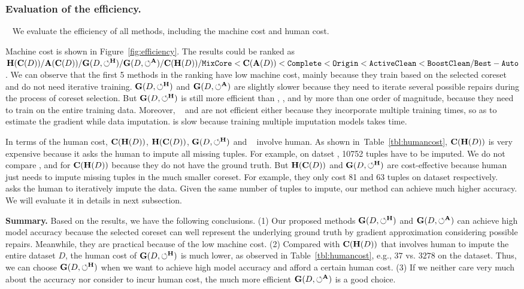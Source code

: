  



\subsubsection{Evaluation of the efficiency.}~\label{sec:exp:efficiency} We  evaluate the efficiency of all methods, including the machine cost and human cost.

 Machine cost is shown  in Figure~\ref{fig:efficiency}.  The results could be ranked as $\mathbf{H}(\mathbf{C}(D))/\mathbf{A}(\mathbf{C}(D))/\mathbf{G}(D,\circlearrowleft^\mathbf{H})/\mathbf{G}(D,\circlearrowleft^\mathbf{A})/\mathbf{C}(\mathbf{H}(D))/{\tt MixCore} < \mathbf{C}(\mathbf{A}(D)) < {\tt Complete} < {\tt Origin} < {\tt ActiveClean} < {\tt BoostClean} /{\tt Best-Auto} $. We can observe that the first 5 methods in the ranking have low machine cost, mainly because they train based on the selected coreset and do not need iterative training. $\mathbf{G}(D,\circlearrowleft^\mathbf{H})$ and  $\mathbf{G}(D,\circlearrowleft^\mathbf{A})$ are slightly slower  because they need to iterate several possible repairs during the process of coreset selection.  But $\mathbf{G}(D,\circlearrowleft^\mathbf{H})$ is still more efficient than \noclean, \truth, \boostclean and \gain by more than one order of magnitude,  because they need to train on the entire training data. 
 Moreover, \actclean~  and \boostclean are  not efficient either because they incorporate multiple training times, so as to estimate the gradient while data imputation. \gain is slow because training multiple imputation models takes time.


 In terms of the human cost, $\mathbf{C}(\mathbf{H}(D))$, $\mathbf{H}(\mathbf{C}(D))$, $\mathbf{G}(D,\circlearrowleft^\mathbf{H})$ and  \actclean~ involve human. As shown in~Table~\ref{tbl:humancost}, $\mathbf{C}(\mathbf{H}(D))$ is very expensive because it asks the human to impute all missing tuples. For example, on datset \adult, 10752 tuples have to be imputed. We do not compare \credit, \bike and \air for $\mathbf{C}(\mathbf{H}(D))$ because they do not have the ground truth.
 But $\mathbf{H}(\mathbf{C}(D))$ and $\mathbf{G}(D,\circlearrowleft^\mathbf{H})$ are cost-effective because human just needs to impute missing tuples in the much smaller coreset. For example, they only cost 81 and 63 tuples on dataset \adult respectively. 
\actclean~ asks the human to iteratively impute the data. Given the same number of tuples to impute, our method can achieve much higher accuracy. We will  evaluate it in details in next subsection.
 



\noindent \textbf{Summary.} 
Based on the results, we have the following conclusions.
(1) Our proposed methods $\mathbf{G}(D,\circlearrowleft^\mathbf{H})$ and $\mathbf{G}(D,\circlearrowleft^\mathbf{A})$ can achieve high model accuracy because the selected coreset can well represent the underlying ground truth by gradient approximation considering possible repairs. Meanwhile, they are practical because of the low machine cost. (2) Compared with $\mathbf{C}(\mathbf{H}(D))$ that involves human to impute the entire dataset $D$, the human cost of $\mathbf{G}(D,\circlearrowleft^\mathbf{H})$ is much lower, as observed in Table~\ref{tbl:humancost}, e.g., $37$ vs. $3278$ on the \nursery dataset. Thus, we can choose $\mathbf{G}(D,\circlearrowleft^\mathbf{H})$ when we want to achieve high model accuracy and afford a certain human cost. (3) 
If we neither care very much about the accuracy nor consider to incur human cost, the much more efficient $\mathbf{G}(D,\circlearrowleft^\mathbf{A})$ is a good choice.